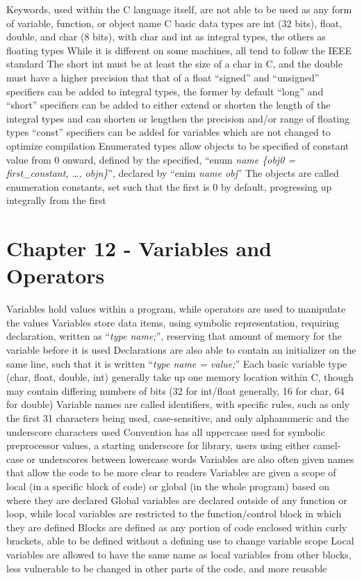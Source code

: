 \documentclass[11 pt, twoside]{article}
\newenvironment{outline*}
{
	\begin{outline}[enumerate]
	}
	{\end{outline}
}
\begin{document}
\begin{outline*}
\2 Keywords, used within the C language itself, are not able to be used as any form of variable, function, or object name
\1 C basic data types are int (32 bits), float, double, and char (8 bits), with char and int as integral types, the others as floating types
\2 While it is different on some machines, all tend to follow the IEEE standard
\2 The short int must be at least the size of a char in C, and the double must have a higher precision that that of a float
\2 ``signed'' and ``unsigned'' specifiers can be added to integral types, the former by default
\2 ``long'' and ``short'' specifiers can be added to either extend or shorten the length of the integral types and can shorten or lengthen the precision and/or range of floating types
\2 ``const'' specifiers can be added for variables which are not changed to optimize compilation
\1 Enumerated types allow objects to be specified of constant value from 0 onward, defined by the specified, ``enum \textit{name \{obj0 = first\_constant, \dots, objn\}}'', declared by ``enim \textit{name obj}''
\2 The objects are called enumeration constants, set such that the first is 0 by default, progressing up integrally from the first
\end{outline*}
\section{Chapter 12 - Variables and Operators}
\begin{outline*}
\1 Variables hold values within a program, while operators are used to manipulate the values
\2 Variables store data items, using symbolic representation, requiring declaration, written as ``\textit{type name;}'', reserving that amount of memory for the variable before it is used
\2 Declarations are also able to contain an initializer on the same line, such that it is written ``\textit{type name = value;}''
\2 Each basic variable type (char, float, double, int) generally take up one memory location within C, though may contain differing numbers of bits (32 for int/float generally, 16 for char, 64 for double)
\2 Variable names are called identifiers, with specific rules, such as only the first 31 characters being used, case-sensitive, and only alphanumeric and the underscore characters used
\3 Convention has all uppercase used for symbolic preprocessor values, a starting underscore for library, users using either camel-case or underscores between lowercase words
\3 Variables are also often given names that allow the code to be more clear to readers
\2 Variables are given a scope of local (in a specific block of code) or global (in the whole program) based on where they are declared
\3 Global variables are declared outside of any function or loop, while local variables are restricted to the function/control block in which they are defined
\3 Blocks are defined as any portion of code enclosed within curly brackets, able to be defined without a defining use to change variable scope
\3 Local variables are allowed to have the same name as local variables from other blocks, less vulnerable to be changed in other parts of the code, and more reusable
\
\end{outline*}
\end{document}
